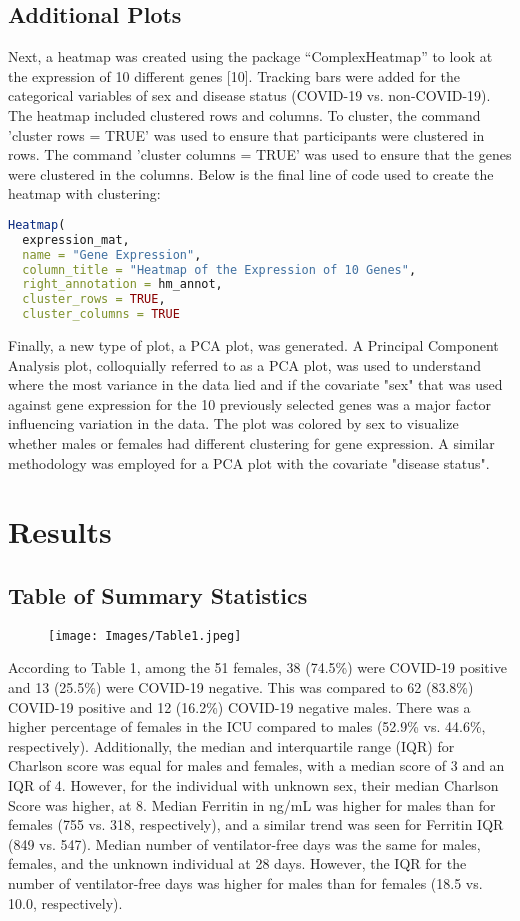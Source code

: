 \documentclass{article}
\begin{document}
\subsection{Additional Plots}
Next, a heatmap was created using the package “ComplexHeatmap” to look at the expression of 10 different genes [10]. Tracking bars were added for the categorical variables of sex and disease status (COVID-19 vs. non-COVID-19). The heatmap included clustered rows and columns. To cluster, the command 'cluster rows = TRUE' was used to ensure that participants were clustered in rows. The command 'cluster columns = TRUE' was used to ensure that the genes were clustered in the columns. Below is the final line of code used to create the heatmap with clustering:
\begin{lstlisting}[language=R]
Heatmap(
  expression_mat,
  name = "Gene Expression", 
  column_title = "Heatmap of the Expression of 10 Genes", 
  right_annotation = hm_annot,
  cluster_rows = TRUE,       
  cluster_columns = TRUE

\end{lstlisting} 
\par
Finally, a new type of plot, a PCA plot, was generated. A Principal Component Analysis plot, colloquially referred to as a PCA plot, was used to understand where the most variance in the data lied and if the covariate "sex" that was used against gene expression for the 10 previously selected genes was a major factor influencing variation in the data. The plot was colored by sex to visualize whether males or females had different clustering for gene expression. A similar methodology was employed for a PCA plot with the covariate "disease status". 

\section{Results}
\subsection{Table of Summary Statistics}
\begin{figure}[hbt!]
    \centering
    \texttt{[image: Images/Table1.jpeg]}
    \label{Summary Stats}
\end{figure}
According to Table 1, among the 51 females, 38 (74.5\%) were COVID-19 positive and 13 (25.5\%) were COVID-19 negative. This was compared to 62 (83.8\%) COVID-19 positive and 12 (16.2\%) COVID-19 negative males. There was a higher percentage of females in the ICU compared to males (52.9\% vs. 44.6\%, respectively). Additionally, the median and interquartile range (IQR) for Charlson score was equal for males and females, with a median score of 3 and an IQR of 4. However, for the individual with unknown sex, their median Charlson Score was higher, at 8. Median Ferritin in ng/mL was higher for males than for females (755 vs. 318, respectively), and a similar trend was seen for Ferritin IQR (849 vs. 547). Median number of ventilator-free days was the same for males, females, and the unknown individual at 28 days. However, the IQR for the number of ventilator-free days was higher for males than for females (18.5 vs. 10.0, respectively).
\end{document}
